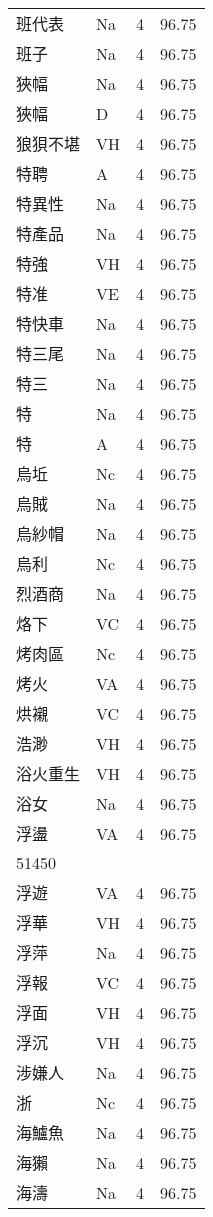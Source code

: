 \documentclass[twocolumn]{book}
\begin{document}
\begin{supertabular}{llrr}
班代表 & Na & 4 &  96.75\\
班子 & Na & 4 &  96.75\\
狹幅 & Na & 4 &  96.75\\
狹幅 & D & 4 &  96.75\\
狼狽不堪 & VH & 4 &  96.75\\
特聘 & A & 4 &  96.75\\
特異性 & Na & 4 &  96.75\\
特產品 & Na & 4 &  96.75\\
特強 & VH & 4 &  96.75\\
特准 & VE & 4 &  96.75\\
特快車 & Na & 4 &  96.75\\
特三尾 & Na & 4 &  96.75\\
特三 & Na & 4 &  96.75\\
特 & Na & 4 &  96.75\\
特 & A & 4 &  96.75\\
烏坵 & Nc & 4 &  96.75\\
烏賊 & Na & 4 &  96.75\\
烏紗帽 & Na & 4 &  96.75\\
烏利 & Nc & 4 &  96.75\\
烈酒商 & Na & 4 &  96.75\\
烙下 & VC & 4 &  96.75\\
烤肉區 & Nc & 4 &  96.75\\
烤火 & VA & 4 &  96.75\\
烘襯 & VC & 4 &  96.75\\
浩渺 & VH & 4 &  96.75\\
浴火重生 & VH & 4 &  96.75\\
浴女 & Na & 4 &  96.75\\
浮盪 & VA & 4 &  96.75\\
51450\\
浮遊 & VA & 4 &  96.75\\
浮華 & VH & 4 &  96.75\\
浮萍 & Na & 4 &  96.75\\
浮報 & VC & 4 &  96.75\\
浮面 & VH & 4 &  96.75\\
浮沉 & VH & 4 &  96.75\\
涉嫌人 & Na & 4 &  96.75\\
浙 & Nc & 4 &  96.75\\
海鱸魚 & Na & 4 &  96.75\\
海獺 & Na & 4 &  96.75\\
海濤 & Na & 4 &  96.75\\

\end{supertabular}
\end{document}
